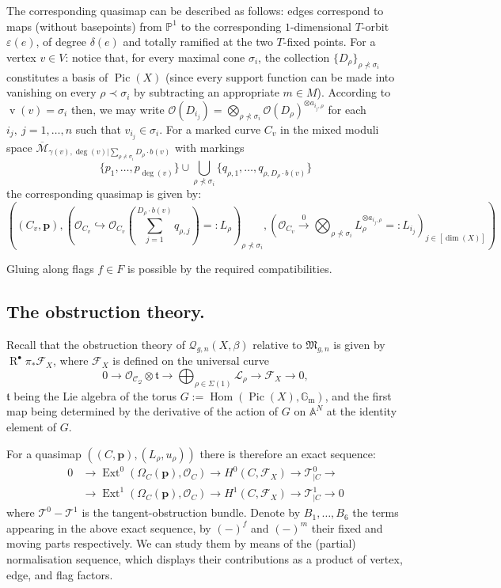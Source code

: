 \documentclass[11pt]{amsart}
\newcommand{\Q}[4]{\mathcal{Q}_{#1,#2}(#3,#4)}
\newcommand{\PP}{\mathbb P}
\newcommand{\OO}{\mathcal{O}}
\renewcommand{\to}{\rightarrow}
\newcommand{\F}{\mathcal F}
\newcommand{\Aaff}{\mathbb{A}}
\newcommand{\Pic}{\operatorname{Pic}}
\newcommand{\Hom}{\operatorname{Hom}}
\newcommand{\Ext}{\operatorname{Ext}}
\newcommand{\Gm}{\mathbb{G}_{\text{m}}}
\newcommand{\R}{\operatorname{R}^{\bullet}}
\newcommand{\vv}{\operatorname{v}}
\theoremstyle{definition}
\theoremstyle{definition}
\begin{document}
The corresponding quasimap can be described as follows: edges correspond to maps (without basepoints) from $\PP^1$ to the corresponding $1$-dimensional $T$-orbit $\varepsilon(e)$, of degree $\delta(e)$ and totally ramified at the two $T$-fixed points. For a vertex $v\in V$: notice that, for every maximal cone $\sigma_i$, the collection $\{D_\rho\}_{\rho\nprec\sigma_i}$ constitutes a basis of $\Pic(X)$ (since every support function can be made into vanishing on every $\rho\prec\sigma_i$ by subtracting an appropriate $m\in M$). According to $\vv(v)=\sigma_i$ then, we may write $\OO(D_{i_j})=\bigotimes_{\rho\nprec\sigma_i} \OO(D_\rho)^{\otimes a_{i_j,\rho}}$ for each $i_j,\ j=1,\ldots,n$ such that $v_{i_j}\in \sigma_i$. For a marked curve $C_v$ in the mixed moduli space $\overline{\mathcal M}_{\gamma(v),\deg(v)|\sum_{\rho\nprec \sigma_i}D_\rho\cdot b(v)}$ with markings
\[
 \{p_1,\ldots,p_{\deg(v)}\}\cup\bigcup_{\rho\nprec\sigma_i}\{q_{\rho,1},\ldots,q_{\rho,D_{\rho}\cdot b(v)}\}
\]
the corresponding quasimap is given by:
\[
 \left((C_v,\mathbf p),(\mathcal O_{C_v}\hookrightarrow\OO_{C_v}(\sum_{j=1}^{D_{\rho}\cdot b(v) }q_{\rho,j})=:L_\rho)_{\rho\nprec\sigma_i},(\mathcal O_{C_v}\xrightarrow{0}\bigotimes_{\rho\nprec\sigma_i} L_\rho^{\otimes a_{i_j,\rho}}=:L_{i_j})_{j\in[\dim(X)]} \right)
\]

Gluing along flags $f\in F$ is possible by the required compatibilities.

\subsection{The obstruction theory.} Recall that the obstruction theory of $\Q{g}{n}{X}{\beta}$ relative to $\mathfrak M_{g,n}$ is given by $\R\pi_*\F_X$, where $\F_X$ is defined on the universal curve
\begin{equation}\label{eqn:F}
 0\to\OO_{\mathcal C_\mathcal Q}\otimes \mathfrak t\to\bigoplus_{\rho\in\Sigma(1)}\mathcal L_\rho\to\F_X\to 0,
\end{equation}
$\mathfrak t$ being the Lie algebra of the torus $G:=\Hom(\Pic(X),\Gm)$, and the first map being determined by the derivative of the action of $G$ on $\Aaff^N$ at the identity element of $G$.

For a quasimap $\left((C,\mathbf p),(L_{\rho},u_{\rho})\right)$ there is therefore an exact sequence:
\begin{align*}
 0&\to \Ext^0(\Omega_C(\mathbf p),\OO_C)\to H^0(C,\F_X)\to \mathcal T^0_{|C}\to \\
  &\to \Ext^1(\Omega_C(\mathbf p),\OO_C)\to H^1(C,\F_X)\to \mathcal T^1_{|C}\to 0
\end{align*}
where $\mathcal T^0-\mathcal T^1$ is the tangent-obstruction bundle.
Denote by $B_1,\ldots, B_6$ the terms appearing in the above exact sequence, by $(-)^f$ and $(-)^m$ their fixed and moving parts respectively. We can study them by means of the (partial) normalisation sequence, which displays their contributions as a product of vertex, edge, and flag factors.
\end{document}
